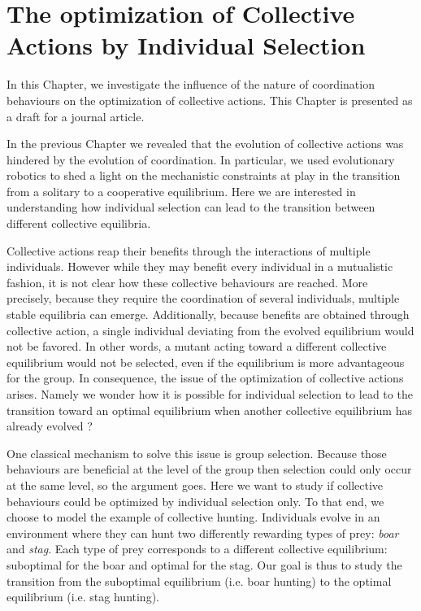 \chapter{The optimization of Collective Actions by Individual Selection}
\label{chapter:C1_article2}

\setcounter{secnumdepth}{0}
\setcounter{minitocdepth}{1}
\minitoc[n] %

In this Chapter, we investigate the influence of the nature of coordination behaviours on the optimization of collective actions. This Chapter is presented as a draft for a journal article.

In the previous Chapter we revealed that the evolution of collective actions was hindered by the evolution of coordination. In particular, we used evolutionary robotics to shed a light on the mechanistic constraints at play in the transition from a solitary to a cooperative equilibrium. Here we are interested in understanding how individual selection can lead to the transition between different collective equilibria.

Collective actions reap their benefits through the interactions of multiple individuals. However while they may benefit every individual in a mutualistic fashion, it is not clear how these collective behaviours are reached. More precisely, because they require the coordination of several individuals, multiple stable equilibria can emerge. Additionally, because benefits are obtained through collective action, a single individual deviating from the evolved equilibrium would not be favored. In other words, a mutant acting toward a different collective equilibrium would not be selected, even if the equilibrium is more advantageous for the group. In consequence, the issue of the optimization of collective actions arises. Namely we wonder how it is possible for individual selection to lead to the transition toward an optimal equilibrium when another collective equilibrium has already evolved ?

One classical mechanism to solve this issue is group selection. Because those behaviours are beneficial at the level of the group then selection could only occur at the same level, so the argument goes. Here we want to study if collective behaviours could be optimized by individual selection only. To that end, we choose to model the example of collective hunting. Individuals evolve in an environment where they can hunt two differently rewarding types of prey: \emph{boar} and \emph{stag}. Each type of prey corresponds to a different collective equilibrium: suboptimal for the boar and optimal for the stag. Our goal is thus to study the transition from the suboptimal equilibrium (i.e. boar hunting) to the optimal equilibrium (i.e. stag hunting).

